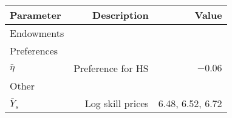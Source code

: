 \begin{tabular}{lrr}
\hline
Parameter & Description  & Value  \\ 
\hline
Endowments &   &   \\ 
Preferences &   &   \\ 
$\bar{\eta}$ & Preference for HS  & $-0.06$  \\ 
Other &   &   \\ 
$\bar{Y}_{s}$ & Log skill prices  & 6.48, 6.52, 6.72  \\ 
\hline
\end{tabular}%
